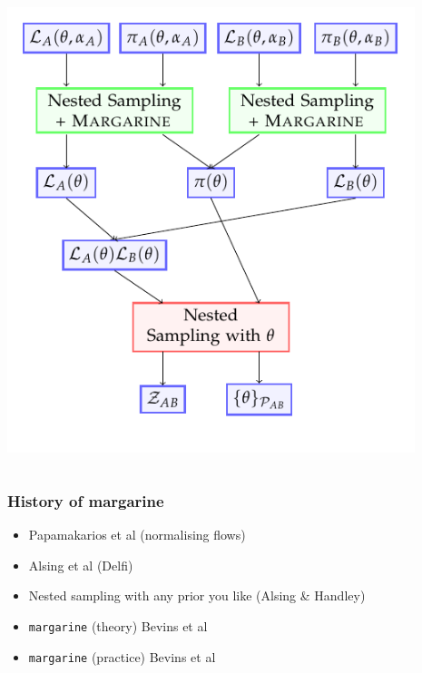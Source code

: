 \documentclass[aspectratio=169]{beamer}
\begin{document}
\begin{frame}
\begin{columns}
        \includegraphics[width=0.9\textwidth]{figures/quick_margarine.pdf}
        
    \end{columns}
\end{frame}

\begin{frame}
    \frametitle{History of margarine}
    \begin{itemize}
        \item Papamakarios et al  (normalising flows)
        \item Alsing et al  (Delfi)
        \item Nested sampling with any prior you like (Alsing \& Handley) 
        \item \texttt{margarine} (theory) Bevins et al 
        \item \texttt{margarine} (practice) Bevins et al 
    \end{itemize}

\end{frame}
\end{document}
